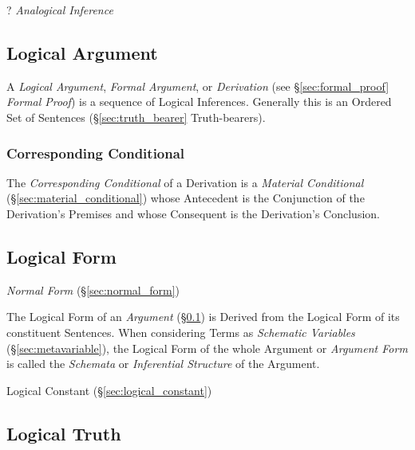 ? \emph{Analogical Inference}



\subsection{Logical Argument}\label{sec:logical_argument}

A \emph{Logical Argument}, \emph{Formal Argument}, or
\emph{Derivation} (see \S\ref{sec:formal_proof} \emph{Formal Proof})
is a sequence of Logical Inferences. Generally this is an Ordered Set
of Sentences (\S\ref{sec:truth_bearer} Truth-bearers).



\subsubsection{Corresponding Conditional}\label{sec:corresponding_conditional}

The \emph{Corresponding Conditional} of a Derivation is a
\emph{Material Conditional} (\S\ref{sec:material_conditional}) whose
Antecedent is the Conjunction of the Derivation's Premises and whose
Consequent is the Derivation's Conclusion.



\subsection{Logical Form}\label{sec:logical_form}

\emph{Normal Form} (\S\ref{sec:normal_form})

The Logical Form of an \emph{Argument} (\S\ref{sec:logical_argument})
is Derived from the Logical Form of its constituent Sentences. When
considering Terms as \emph{Schematic Variables}
(\S\ref{sec:metavariable}), the Logical Form of the whole Argument or
\emph{Argument Form} is called the \emph{Schemata} or
\emph{Inferential Structure} of the Argument.



Logical Constant (\S\ref{sec:logical_constant})



\subsection{Logical Truth}\label{sec:logical_truth}

